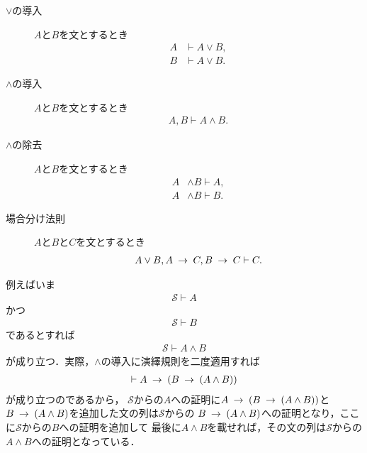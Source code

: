 	\begin{description}
		\item[$\vee$の導入] $A$と$B$を文とするとき
			\begin{align}
				A &\vdash A \vee B, \\
				B &\vdash A \vee B.
			\end{align}
		
		\item[$\wedge$の導入] $A$と$B$を文とするとき
			\begin{align}
				A,B \vdash A \wedge B.
			\end{align}
		
		\item[$\wedge$の除去] $A$と$B$を文とするとき
			\begin{align}
				A &\wedge B \vdash A, \\
				A &\wedge B \vdash B.
			\end{align}
			
		\item[場合分け法則] $A$と$B$と$C$を文とするとき
			\begin{align}
				A \vee B, A \hspace{0.25em}\rightarrow\hspace{0.25em} C, B \hspace{0.25em}\rightarrow\hspace{0.25em} C \vdash C.
			\end{align}
	\end{description}
	
	例えばいま
	\begin{align}
		\mathscr{S} \vdash A
	\end{align}
	かつ
	\begin{align}
		\mathscr{S} \vdash B
	\end{align}
	であるとすれば
	\begin{align}
		\mathscr{S} \vdash A \wedge B
	\end{align}
	が成り立つ．実際，$\wedge$の導入に演繹規則を二度適用すれば
	\begin{align}
		\vdash A \hspace{0.25em}\rightarrow\hspace{0.25em} (B \hspace{0.25em}\rightarrow\hspace{0.25em} (A \wedge B))
	\end{align}
	が成り立つのであるから，
	$\mathscr{S}$からの$A$への証明に$A \hspace{0.25em}\rightarrow\hspace{0.25em} (B \hspace{0.25em}\rightarrow\hspace{0.25em} (A \wedge B))$と
	$B \hspace{0.25em}\rightarrow\hspace{0.25em} (A \wedge B)$を追加した文の列は$\mathscr{S}$からの
	$B \hspace{0.25em}\rightarrow\hspace{0.25em} (A \wedge B)$への証明となり，ここに$\mathscr{S}$からの$B$への証明を追加して
	最後に$A \wedge B$を載せれば，その文の列は$\mathscr{S}$からの$A \wedge B$への証明となっている．